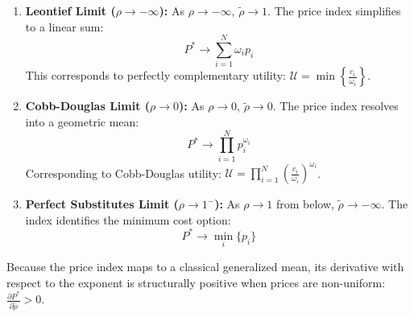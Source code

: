 \documentclass{article}
\begin{document}
\begin{enumerate}
    \item \textbf{Leontief Limit (}$\rho \to -\infty$\textbf{):} As $\rho \to -\infty$,
    $\tilde{\rho} \to 1$. The price index simplifies to a linear sum:
    $$
    P^* \to \sum_{i=1}^N \omega_i p_i
    $$ 
    This corresponds to
    perfectly complementary utility:
    $\mathcal{U} = \min \left\{ \frac{c_i}{\omega_i} \right\}$.

    \item \textbf{Cobb-Douglas Limit (}$\rho \to 0$\textbf{):} As $\rho \to 0$,
    $\tilde{\rho} \to 0$. The price index resolves into a geometric
    mean: $$ P^* \to \prod_{i=1}^N p_i^{\omega_i} $$ Corresponding to
    Cobb-Douglas utility:
    $\mathcal{U} = \prod_{i=1}^N \left(\frac{c_i}{\omega_i}\right)^{\omega_i}$.

    \item \textbf{Perfect Substitutes Limit (}$\rho \to 1^-$\textbf{):} As $\rho \to 1$ from
    below, $\tilde{\rho} \to -\infty$. The index identifies the minimum
    cost option: $$ P^* \to \min_i \{ p_i \} $$
\end{enumerate}

Because the price index maps to a classical generalized mean, its
derivative with respect to the exponent is structurally positive when
prices are non-uniform:
$\frac{\partial P^*}{\partial \tilde{\rho}} > 0$.
\end{document}

